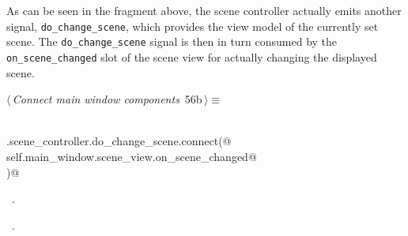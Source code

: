\documentclass[
    a4paper,      %
    10pt,         %
    openright,    %
    notitlepage,  %
    parskip=half, %
]{scrreprt}       %
\theoremstyle{definition}                    %
\begin{document}
As can be seen in the fragment above, the scene controller actually emits
another signal, \verb+do_change_scene+, which provides the view model of the
currently set scene.
The \verb+do_change_scene+ signal is then in turn consumed by the
\verb+on_scene_changed+ slot of the scene view for actually changing the
displayed scene.

\begin{flushleft} \small
\begin{minipage}{\linewidth}\label{scrap88}\raggedright\small
{} $\langle\,${\itshape Connect main window components}\nobreak\ {\footnotesize {56b}}$\,\rangle\equiv$
\vspace{-1exm}
\begin{list}{}{} \item
\mbox{}\lstinline@@\\
\mbox{}\lstinline@self.scene_controller.do_change_scene.connect(@\\
\mbox{}\lstinline@    self.main_window.scene_view.on_scene_changed@\\
\mbox{}\lstinline@)@{\NWsep}
\end{list}
\vspace{-1.5ex}
\footnotesize
\begin{list}{}{\setlength{\itemsep}{-\parsep}\setlength{\itemindent}{-\leftmargin}}
\item \NWtxtMacroDefBy\ .
\item \NWtxtMacroRefIn\ .

\item{}
\end{list}
\end{minipage}\vspace{4ex}
\end{flushleft}
\end{document}

